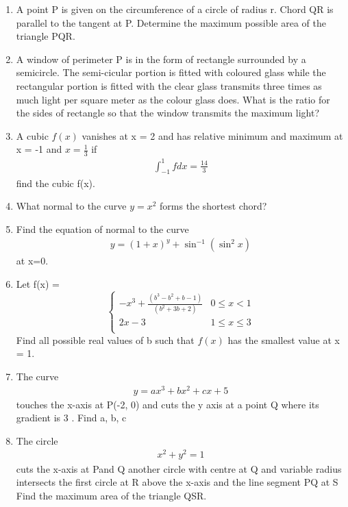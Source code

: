 \begin{enumerate}[label=\arabic*.,ref=\thesubsection.\theenumi]
\item A point P is given on the circumference of a circle of radius r. Chord QR is parallel to the tangent at P. Determine the maximum possible area of the triangle PQR.

\item A window of perimeter P is in the form of rectangle surrounded by a semicircle. The semi-cicular portion is fitted with coloured glass while the rectangular portion is fitted with the clear glass transmits three times as much light per square meter as the colour glass does. What is the ratio for the sides of rectangle so that the window transmits the maximum light?

\item A cubic $f(x)$ vanishes at x = 2 and has relative minimum and maximum at x = -1 and $x = \frac{1}{3}$ if 
\begin{align*}
\int_{-1}^{1}fdx = \frac{14}{3}
\end{align*}
find the cubic f(x).

\item What normal to the curve $y = x^2$ forms the shortest chord?

\item Find the equation of normal to the curve 
\begin{align*}
y = (1 + x)^y + \sin^{-1}(\sin^2 x)
\end{align*} 
at x=0. 

\item Let 
f(x) = 
\[ \begin{cases} 
      -x^3 + \frac{(b^3 - b^2 + b - 1)}{(b^2 + 3b + 2)} &  0 \leq x < 1\\
      2x - 3 & 1 \leq x \leq 3\\
      \end{cases}
\]
Find all possible real values of b such that $f(x)$ has the smallest value at x = 1.

\item The curve 
\begin{align}
y = ax^3 + bx^2 + cx + 5
\end{align} 
touches the x-axis at P(-2, 0) and cuts the y axis at a point Q where its gradient is 3 . Find a, b, c

\item The circle 
\begin{align}
x^2 + y^2 = 1
\end{align} 
cuts the x-axis at Pand Q another circle with centre at Q and variable radius intersects the first circle at R above the x-axis and the line segment PQ at S Find the maximum area of the triangle QSR.


\end{enumerate}
